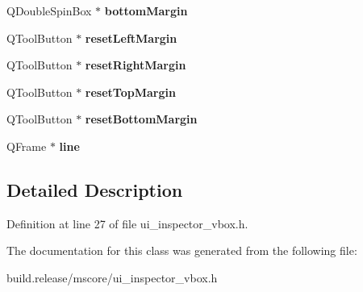 \begin{DoxyCompactItemize}
Q\+Double\+Spin\+Box $\ast$ {\bfseries bottom\+Margin}
\item 
\mbox{\label{class_ui___inspector_v_box_af3dfaeb8bf77b0734789518ecd61297e}} 
Q\+Tool\+Button $\ast$ {\bfseries reset\+Left\+Margin}
\item 
\mbox{\label{class_ui___inspector_v_box_ac69b1d3a95195611ccb42a8ae159ee76}} 
Q\+Tool\+Button $\ast$ {\bfseries reset\+Right\+Margin}
\item 
\mbox{\label{class_ui___inspector_v_box_acab0a177bbe71274ce449743c73046b9}} 
Q\+Tool\+Button $\ast$ {\bfseries reset\+Top\+Margin}
\item 
\mbox{\label{class_ui___inspector_v_box_abc92c5040767a52c018883dfd407947b}} 
Q\+Tool\+Button $\ast$ {\bfseries reset\+Bottom\+Margin}
\item 
\mbox{\label{class_ui___inspector_v_box_aaed5bcf830e478aa2c096352510e81a3}} 
Q\+Frame $\ast$ {\bfseries line}
\end{DoxyCompactItemize}


\subsection{Detailed Description}


Definition at line 27 of file ui\+\_\+inspector\+\_\+vbox.\+h.



The documentation for this class was generated from the following file\+:\begin{DoxyCompactItemize}
\item 
build.\+release/mscore/ui\+\_\+inspector\+\_\+vbox.\+h\end{DoxyCompactItemize}
